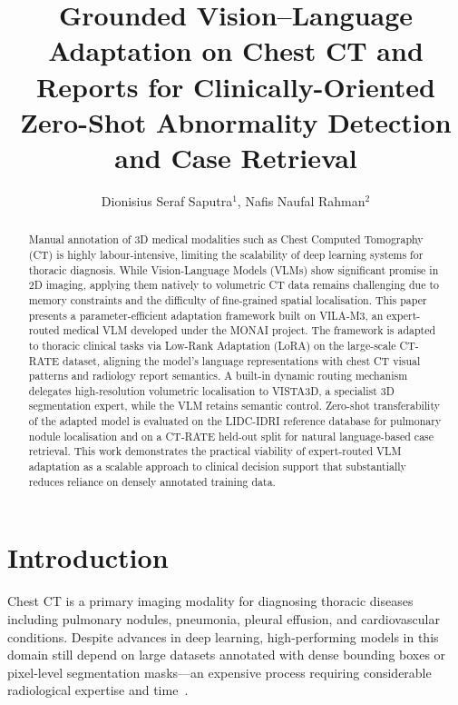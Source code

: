 \documentclass{iopconfser}
\begin{document}
\title{Grounded Vision--Language Adaptation on Chest CT and Reports for
Clinically-Oriented Zero-Shot Abnormality Detection and Case Retrieval}

\author{Dionisius Seraf Saputra$^{1}$, Nafis Naufal Rahman$^{2}$}



\begin{abstract}
Manual annotation of 3D medical modalities such as Chest Computed Tomography
(CT) is highly labour-intensive, limiting the scalability of deep learning
systems for thoracic diagnosis. While Vision-Language Models (VLMs) show
significant promise in 2D imaging, applying them natively to volumetric CT
data remains challenging due to memory constraints and the difficulty of
fine-grained spatial localisation. This paper presents a parameter-efficient
adaptation framework built on VILA-M3, an expert-routed medical VLM developed
under the MONAI project. The framework is adapted to thoracic clinical tasks
via Low-Rank Adaptation (LoRA) on the large-scale CT-RATE dataset, aligning
the model's language representations with chest CT visual patterns and radiology
report semantics. A built-in dynamic routing mechanism delegates high-resolution
volumetric localisation to VISTA3D, a specialist 3D segmentation expert, while
the VLM retains semantic control. Zero-shot transferability of the adapted model
is evaluated on the LIDC-IDRI reference database for pulmonary nodule
localisation and on a CT-RATE held-out split for natural language-based case
retrieval. This work demonstrates the practical viability of expert-routed VLM
adaptation as a scalable approach to clinical decision support that substantially
reduces reliance on densely annotated training data.
\end{abstract}


\section{Introduction}

Chest CT is a primary imaging modality for diagnosing thoracic diseases
including pulmonary nodules, pneumonia, pleural effusion, and cardiovascular
conditions. Despite advances in deep learning, high-performing models in this
domain still depend on large datasets annotated with dense bounding boxes or
pixel-level segmentation masks---an expensive process requiring considerable
radiological expertise and time~\cite{litjens2017}.
\end{document}
